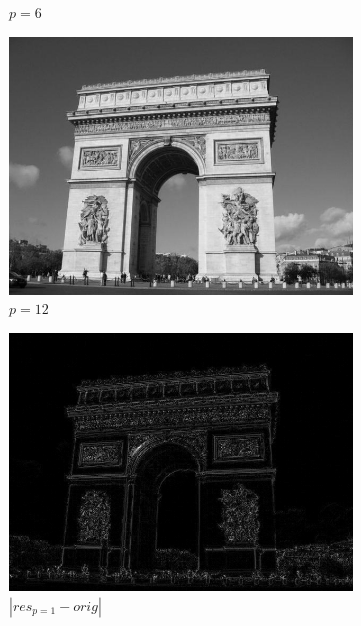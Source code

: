 \documentclass[a4paper,10pt]{report}
\begin{document}
\begin{figure}[h]
\begin{subfigure}{0.32\textwidth}
    \caption{\(p=6\)}
    \label{fig:p6}
  \end{subfigure}
  \begin{subfigure}{0.32\textwidth}
    \includegraphics[width=0.99\linewidth]{ressource/flouresultat_p12.png} 
    \caption{\(p=12\)}
    \label{fig:p12}
  \end{subfigure}
  \begin{subfigure}{0.32\textwidth}
    \includegraphics[width=0.99\linewidth]{ressource/diffp1stretch.png} 
    \caption{\(|res_{p=1} - orig|\)}
    \label{fig:diffp1}
  \end{subfigure}
  \begin{subfigure}{0.32\textwidth}

\end{subfigure}
\end{figure}
\end{document}
